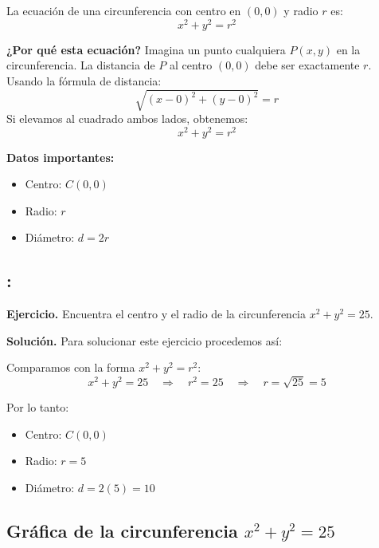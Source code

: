 \documentclass[12pt,a4paper]{article}
\begin{document}
	La ecuación de una circunferencia con centro en $(0,0)$ y radio $r$ es:
	\[
	\boxed{x^2+y^2=r^2}
	\]

	\textbf{¿Por qué esta ecuación?} Imagina un punto cualquiera $P(x,y)$ en la circunferencia. La distancia de $P$ al centro $(0,0)$ debe ser exactamente $r$. Usando la fórmula de distancia:
	\[
	\sqrt{(x-0)^2+(y-0)^2}=r
	\]
	Si elevamos al cuadrado ambos lados, obtenemos:
	\[
	x^2+y^2=r^2
	\]

	\bigskip

	\textbf{Datos importantes:}
	\begin{itemize}
		\item Centro: $C(0,0)$
		\item Radio: $r$
		\item Diámetro: $d=2r$
	\end{itemize}

	\subsection*{{\color{blue!50!red}{Ejemplo 1}}: \color{blue!80!black}{Circunferencia con centro en el origen}}

	\textbf{Ejercicio.} Encuentra el centro y el radio de la circunferencia $x^2+y^2=25$.

	\bigskip

	\textbf{Solución.} Para solucionar este ejercicio procedemos así:

	\bigskip

	Comparamos con la forma $x^2+y^2=r^2$:
	\[
	x^2+y^2=25 \quad\Rightarrow\quad r^2=25 \quad\Rightarrow\quad r=\sqrt{25}=5
	\]

	Por lo tanto:
	\begin{itemize}
		\item Centro: $\boxed{C(0,0)}$
		\item Radio: $\boxed{r=5}$
		\item Diámetro: $\boxed{d=2(5)=10}$
	\end{itemize}

	\subsection*{Gráfica de la circunferencia $x^2+y^2=25$}
\end{document}
